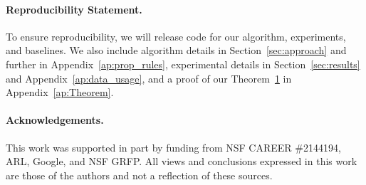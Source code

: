 \paragraph{Reproducibility Statement.}
To ensure reproducibility, we will release code for our algorithm, experiments, and baselines. We also include algorithm details in Section~\ref{sec:approach} and further in Appendix~\ref{ap:prop_rules}, experimental details in Section~\ref{sec:results} and Appendix~\ref{ap:data_usage}, and a proof of our Theorem~\hyperref[ap:TheoremDef]{1} in Appendix~\ref{ap:Theorem}.

\paragraph{Acknowledgements.}
This work was supported in part by funding from NSF CAREER \#2144194, ARL, Google, and NSF GRFP. All views and conclusions expressed in this work are those of the authors and not a reflection of these sources.